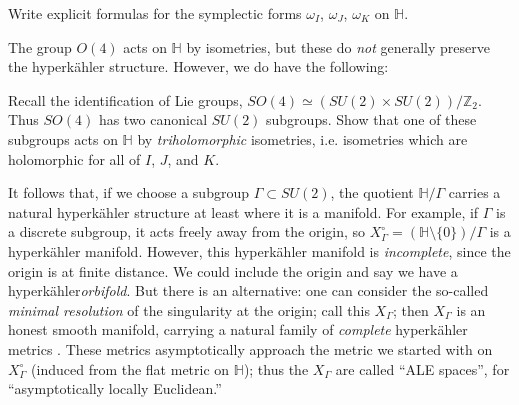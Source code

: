 \documentclass[12pt,letterpaper,reqno]{amsart}
\numberwithin{equation}{section}
\newcommand{\Z}{\ensuremath{\mathbb Z}}
\newcommand{\bbH}{\ensuremath{\mathbb H}}
\newcommand{\hk}{hyperk\"ahler\xspace}
\newcommand{\ti}[1]{\textit{#1}}
\newcommand{\fixme}[1]{{\color{blue}{[#1]}}}
\begin{document}
\begin{exercise}
Write explicit formulas for the symplectic forms
$\omega_I$, $\omega_J$, $\omega_K$ on $\bbH$.
\end{exercise}

The group $O(4)$ acts on $\bbH$ by isometries, but 
these do \ti{not} generally preserve the \hk structure.
However, we do have the following:
\begin{exercise}
Recall the identification of Lie groups, $SO(4) \simeq (SU(2) \times SU(2)) / \Z_2$. Thus $SO(4)$ has two canonical $SU(2)$ subgroups. Show that one of these
subgroups acts on $\bbH$ by \ti{triholomorphic} isometries, i.e. isometries which are holomorphic for
all of $I$, $J$, and $K$.
\end{exercise}

\begin{example}
It follows that, if we choose a subgroup
$\Gamma \subset SU(2)$, the quotient
$\bbH / \Gamma$ carries a natural \hk structure 
at least where it is a manifold. For example,
if $\Gamma$ is a discrete subgroup, it acts
freely away from the origin, so
$X_\Gamma^\circ = (\bbH \setminus \{0\}) / \Gamma$
is a \hk manifold.
However, this \hk manifold is \ti{incomplete},
since the origin is at finite distance.
We could include the origin and say we have 
a \hk \ti{orbifold}. But there is an alternative: 
one can consider the so-called 
\ti{minimal resolution} of the singularity at the 
origin; call this $X_\Gamma$;
then $X_\Gamma$ is an honest smooth manifold, 
carrying a natural family 
of \ti{complete} \hk metrics \cite{MR90d:53055}.
These metrics asymptotically approach
the metric we started with on $X_\Gamma^\circ$
(induced from the flat metric on $\bbH$);
thus the $X_\Gamma$ are called ``ALE spaces'',
for ``asymptotically locally Euclidean.''
\end{example}

\fixme{reduced holonomy}

\fixme{holomorphic symplectic form}

\fixme{Ricci-flatness}

\fixme{twistor family}

\printbibliography
\end{document}

